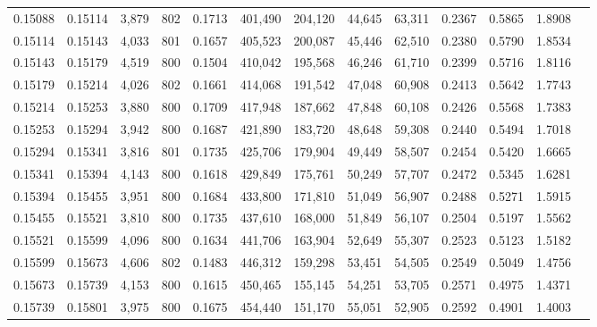 \begin{tabular}{rrrrrrrrrrrrr}
0.15088 & 0.15114 &  3,879 & 802 &                                     0.1713 & 401,490 & 204,120 &  44,645 &  63,311 & 0.2367 & 0.5865 & 1.8908 \\
0.15114 & 0.15143 &  4,033 & 801 &                                     0.1657 & 405,523 & 200,087 &  45,446 &  62,510 & 0.2380 & 0.5790 & 1.8534 \\
0.15143 & 0.15179 &  4,519 & 800 &                                     0.1504 & 410,042 & 195,568 &  46,246 &  61,710 & 0.2399 & 0.5716 & 1.8116 \\
0.15179 & 0.15214 &  4,026 & 802 &                                     0.1661 & 414,068 & 191,542 &  47,048 &  60,908 & 0.2413 & 0.5642 & 1.7743 \\
0.15214 & 0.15253 &  3,880 & 800 &                                     0.1709 & 417,948 & 187,662 &  47,848 &  60,108 & 0.2426 & 0.5568 & 1.7383 \\
0.15253 & 0.15294 &  3,942 & 800 &                                     0.1687 & 421,890 & 183,720 &  48,648 &  59,308 & 0.2440 & 0.5494 & 1.7018 \\
0.15294 & 0.15341 &  3,816 & 801 &                                     0.1735 & 425,706 & 179,904 &  49,449 &  58,507 & 0.2454 & 0.5420 & 1.6665 \\
0.15341 & 0.15394 &  4,143 & 800 &                                     0.1618 & 429,849 & 175,761 &  50,249 &  57,707 & 0.2472 & 0.5345 & 1.6281 \\
0.15394 & 0.15455 &  3,951 & 800 &                                     0.1684 & 433,800 & 171,810 &  51,049 &  56,907 & 0.2488 & 0.5271 & 1.5915 \\
0.15455 & 0.15521 &  3,810 & 800 &                                     0.1735 & 437,610 & 168,000 &  51,849 &  56,107 & 0.2504 & 0.5197 & 1.5562 \\
0.15521 & 0.15599 &  4,096 & 800 &                                     0.1634 & 441,706 & 163,904 &  52,649 &  55,307 & 0.2523 & 0.5123 & 1.5182 \\
0.15599 & 0.15673 &  4,606 & 802 &                                     0.1483 & 446,312 & 159,298 &  53,451 &  54,505 & 0.2549 & 0.5049 & 1.4756 \\
0.15673 & 0.15739 &  4,153 & 800 &                                     0.1615 & 450,465 & 155,145 &  54,251 &  53,705 & 0.2571 & 0.4975 & 1.4371 \\
0.15739 & 0.15801 &  3,975 & 800 &                                     0.1675 & 454,440 & 151,170 &  55,051 &  52,905 & 0.2592 & 0.4901 & 1.4003 \\

\end{tabular}
